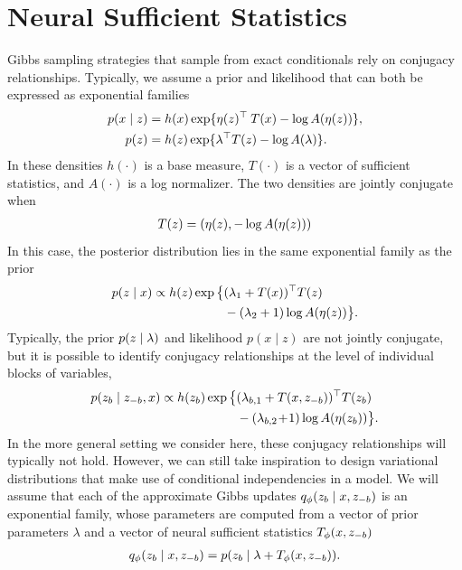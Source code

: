 \documentclass{article}
\theoremstyle{definition}
\begin{document}
\section{Neural Sufficient Statistics}
Gibbs sampling strategies that sample from exact conditionals rely on conjugacy relationships. Typically, we assume a prior and likelihood that can both be expressed as exponential families
\begin{align*}
    p(x \mid z) 
    &= 
    h(x) \exp \{ 
        \eta(z)^\top \: T(x)  
        -\log A(\eta(z)) \}, 
    \\
    p(z ) 
    &= 
    h(z) \exp \{ 
        \lambda^\top T(z) 
        - \log A(\lambda) \}.
\end{align*}
In these densities $h(\cdot)$ is a base measure, $T(\cdot)$ is a vector of sufficient statistics, and $A(\cdot)$ is a log normalizer. The two densities are jointly conjugate when
\begin{align*}
    T(z) = (\eta(z), -\log A(\eta(z)))
\end{align*}
In this case, the posterior distribution lies in the same exponential family as the prior
\begin{align*}
    p(z \mid x) 
    \propto 
    h(z)
    \exp 
    \big\{
        & (\lambda_1 + T(x))^\top T(z) 
        \\
        &
        -
        (\lambda_2 + 1) 
        \log A(\eta(z))
    \big\}
    .
\end{align*}
Typically, the prior $p(z \mid \lambda)$ and likelihood $p(x \mid z)$ are not jointly conjugate, but it is possible to identify conjugacy relationships at the level of individual blocks of variables, 
\begin{align*}
    p(z_b \mid z_{-b}, x)
    \propto
    h(z_b) 
    \exp \big\{ 
        &
        (\lambda_{b,1} + T(x, z_{-b}))^\top T(z_b) 
        \\
        &
        -
        (\lambda_{b,2} \!+\! 1) 
        \log A(\eta(z_b))
    \big\}
    .
\end{align*}
In the more general setting we consider here, these conjugacy relationships will typically not hold. However, we can still take inspiration to design variational distributions that make use of conditional independencies in a model. We will assume that each of the approximate Gibbs updates $q_\phi(z_b \mid x, z_{-b})$ is an exponential family, whose parameters are computed from a vector of prior parameters $\lambda$ and a vector of neural sufficient statistics $T_\phi(x, z_{-b})$
\begin{align}
    q_\phi(z_b \mid x, z_{-b}) 
    = 
    p(z_b \mid \lambda + T_\phi(x, z_{-b}))
    .
\end{align}
\end{document}
